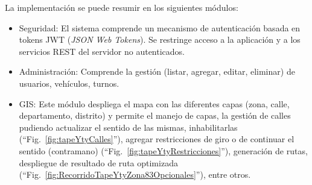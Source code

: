 \documentclass[conference]{IEEEtran}
\begin{document}
La implementación se puede resumir en los siguientes módulos:
\begin{itemize}
    \item Seguridad: El sistema comprende un mecanismo de autenticación basada en tokens JWT (\textit{JSON Web Tokens}). Se restringe acceso a la aplicación y a los servicios REST del servidor no autenticados.
    \item Administración: Comprende la gestión (listar, agregar, editar, eliminar) de usuarios, vehículos, turnos.
    \item GIS: Este módulo despliega el mapa con las diferentes capas (zona, calle, departamento, distrito) y permite el manejo de capas, la gestión de calles pudiendo actualizar el sentido de las mismas, inhabilitarlas (``Fig.~\ref{fig:tapeYtyCalles}''), agregar restricciones de giro o de continuar el sentido (contramano) (``Fig.~\ref{fig:tapeYtyRestricciones}''), generación de rutas, despliegue de resultado de ruta optimizada (``Fig.~\ref{fig:RecorridoTapeYtyZona83Opcionales}''), entre otros.
\end{itemize}
\end{document}
